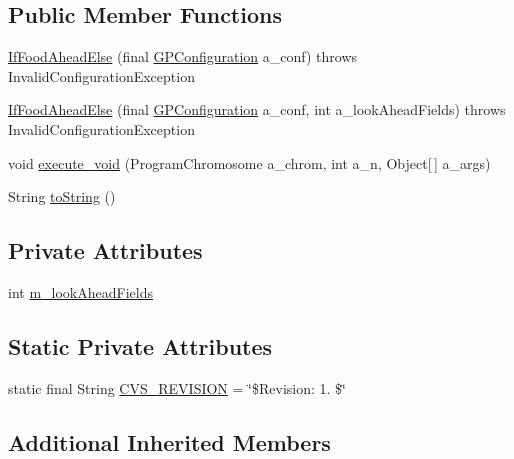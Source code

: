 \subsection*{Public Member Functions}
\begin{DoxyCompactItemize}
\item 
\hyperlink{classexamples_1_1gp_1_1anttrail_1_1_if_food_ahead_else_a77fee4cb0508a913cf68770767632a35}{If\-Food\-Ahead\-Else} (final \hyperlink{classorg_1_1jgap_1_1gp_1_1impl_1_1_g_p_configuration}{G\-P\-Configuration} a\-\_\-conf)  throws Invalid\-Configuration\-Exception 
\item 
\hyperlink{classexamples_1_1gp_1_1anttrail_1_1_if_food_ahead_else_a5ebcffd9ff334d6420bba52b6b658ec3}{If\-Food\-Ahead\-Else} (final \hyperlink{classorg_1_1jgap_1_1gp_1_1impl_1_1_g_p_configuration}{G\-P\-Configuration} a\-\_\-conf, int a\-\_\-look\-Ahead\-Fields)  throws Invalid\-Configuration\-Exception 
\item 
void \hyperlink{classexamples_1_1gp_1_1anttrail_1_1_if_food_ahead_else_a5e364c6a21ae7b604ce0393c8105be72}{execute\-\_\-void} (Program\-Chromosome a\-\_\-chrom, int a\-\_\-n, Object\mbox{[}$\,$\mbox{]} a\-\_\-args)
\item 
String \hyperlink{classexamples_1_1gp_1_1anttrail_1_1_if_food_ahead_else_a9d020596554889ab2c473b2b4846c358}{to\-String} ()
\end{DoxyCompactItemize}
\subsection*{Private Attributes}
\begin{DoxyCompactItemize}
\item 
int \hyperlink{classexamples_1_1gp_1_1anttrail_1_1_if_food_ahead_else_a53d378f85489cf7db4b876833398b38f}{m\-\_\-look\-Ahead\-Fields}
\end{DoxyCompactItemize}
\subsection*{Static Private Attributes}
\begin{DoxyCompactItemize}
\item 
static final String \hyperlink{classexamples_1_1gp_1_1anttrail_1_1_if_food_ahead_else_aa79c2239fcf2cda22d40754ec0ea15fa}{C\-V\-S\-\_\-\-R\-E\-V\-I\-S\-I\-O\-N} = \char`\"{}\$Revision\-: 1. \$\char`\"{}
\end{DoxyCompactItemize}
\subsection*{Additional Inherited Members}


